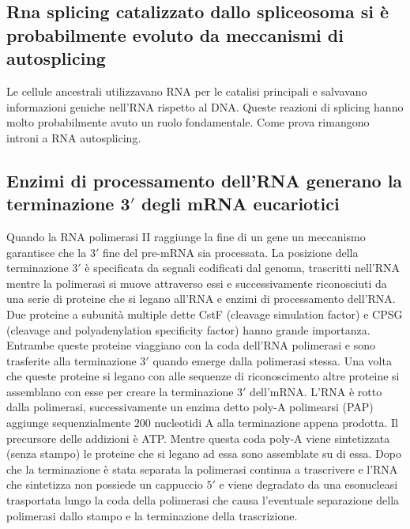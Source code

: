 \subsection{Rna splicing catalizzato dallo spliceosoma si \`e probabilmente evoluto da meccanismi di autosplicing}
Le cellule ancestrali utilizzavano RNA  per le catalisi principali e salvavano informazioni geniche nell'RNA rispetto al DNA. Queste reazioni di splicing hanno molto probabilmente avuto
un ruolo fondamentale. Come prova rimangono introni a RNA autosplicing. 
\subsection{Enzimi di processamento dell'RNA generano la terminazione $\mathbf{3'}$ degli mRNA eucariotici}
Quando la RNA polimerasi II raggiunge la fine di un gene un meccanismo garantisce che la $3'$ fine del pre-mRNA sia processata. La posizione della terminazione $3'$ \`e specificata da
segnali codificati dal genoma, trascritti nell'RNA mentre la polimerasi si muove attraverso essi e successivamente riconosciuti da una serie di proteine che si legano all'RNA e 
enzimi di processamento dell'RNA. Due proteine a subunit\`a multiple dette CstF (cleavage simulation factor) e CPSG (cleavage and polyadenylation specificity factor) hanno grande 
importanza. Entrambe queste proteine viaggiano con la coda dell'RNA polimerasi e sono trasferite alla terminazione $3'$ quando emerge dalla polimerasi stessa. Una volta che queste
proteine si legano con alle sequenze di riconoscimento altre proteine si assemblano con esse per creare la terminazione $3'$ dell'mRNA. L'RNA \`e rotto dalla polimerasi, successivamente
un enzima detto poly-A polimearsi (PAP) aggiunge sequenzialmente $200$ nucleotidi A alla terminazione appena prodotta. Il precursore delle addizioni \`e ATP. Mentre questa coda poly-A
viene sintetizzata (senza stampo) le proteine che si legano ad essa sono assemblate su di essa. Dopo che la terminazione \`e stata separata la polimerasi continua a trascrivere e l'RNA
che sintetizza non possiede un cappuccio $5'$ e viene degradato da una esonucleasi trasportata lungo la coda della polimerasi che causa l'eventuale separazione della polimerasi dallo
stampo e la terminazione della trascrizione.
